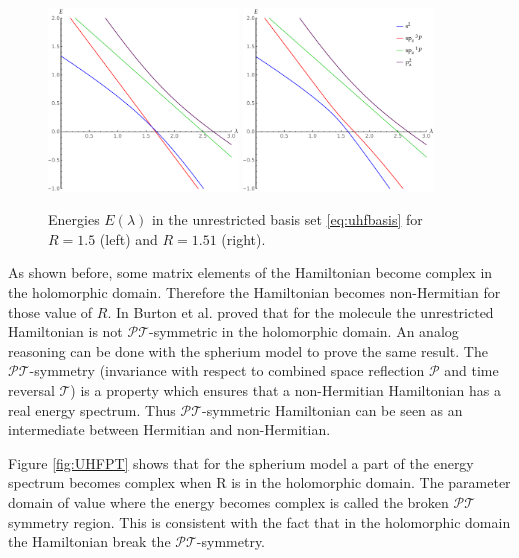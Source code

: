 \documentclass[11pt,a4paper]{article}
\newcommand{\pt}{$\mathcal{PT}$}
\begin{document}
\begin{figure}[h!]
    \centering
    \includegraphics[width=0.45\textwidth]{UHFCI.pdf}
    \includegraphics[width=0.45\textwidth]{UHFEP.pdf}
    \caption{\centering Energies $E(\lambda)$ in the unrestricted basis set \eqref{eq:uhfbasis} for $R=1.5$ (left) and $R=1.51$ (right).}
    \label{fig:UHFEP}
\end{figure}

As shown before, some matrix elements of the Hamiltonian become complex in the holomorphic domain. Therefore the Hamiltonian becomes non-Hermitian for those value of $R$. In \cite{Burton_2019a} Burton et al. proved that for the  molecule the unrestricted Hamiltonian is not \pt -symmetric in the holomorphic domain. An analog reasoning can be done with the spherium model to prove the same result. The \pt -symmetry (invariance with respect to combined space reflection $\mathcal{P}$ and time reversal $\mathcal{T}$) is a property which ensures that a non-Hermitian Hamiltonian has a real energy spectrum. Thus \pt -symmetric Hamiltonian can be seen as an intermediate between Hermitian and non-Hermitian.

Figure \ref{fig:UHFPT} shows that for the spherium model a part of the energy spectrum becomes complex when R is in the holomorphic domain. The parameter domain of value where the energy becomes complex is called the broken \pt symmetry  region. This is consistent with the fact that in the holomorphic domain the Hamiltonian break the \pt -symmetry. 
\end{document}

